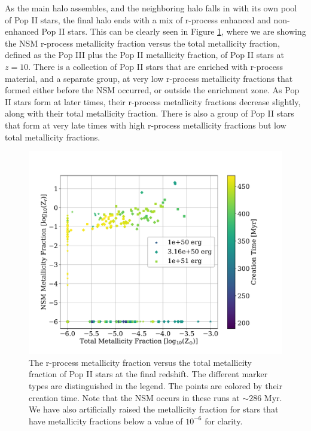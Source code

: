 \documentclass[fleqn,usenatbib]{mnras}
\begin{document}
As the main halo assembles, and the neighboring halo falls in with its own pool of Pop II stars, the final halo ends with a mix of r-process enhanced and non-enhanced Pop II stars. This can be clearly seen in Figure \ref{fig:eng_NSM_p3}, where we are showing the NSM r-process metallicity fraction versus the total metallicity fraction, defined as the Pop III plus the Pop II metallicity fraction, of Pop II stars at $z = 10$. There is a collection of Pop II stars that are enriched with r-process material, and a separate group, at very low r-process metallicity fractions that formed either before the NSM occurred, or outside the enrichment zone. As Pop II stars form at later times, their r-process metallicity fractions decrease slightly, along with their total metallicity fraction. There is also a group of Pop II stars that form at very late times with high r-process metallicity fractions but low total metallicity fractions. 
 
\begin{figure} 
	\includegraphics[width=\columnwidth]{plots/eng_NSM_tot.pdf}
	\caption[R-process metallicity fraction versus the total metallicity fraction for Pop II stars in the explosion energy variation runs.]{The r-process metallicity fraction versus the total metallicity fraction of Pop II stars at the final redshift. The different marker types are distinguished in the legend. The points are colored by their creation time. Note that the NSM occurs in these runs at $\sim 286$ Myr. We have also artificially raised the metallicity fraction for stars that have metallicity fractions below a value of $10^{-6}$ for clarity.}
	\label{fig:eng_NSM_p3}
\end{figure}
\end{document}
